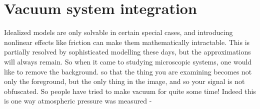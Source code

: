 




\section{Vacuum system integration}
	
	Idealized models are only	solvable in certain special cases, and introducing nonlinear effects	like friction can make them mathematically intractable.
	This is	partially resolved by sophisticated modelling these days, but the	approximations will always remain.
	So when it came to studying	microscopic systems, one would like to remove the background.
	so that	the thing you are examining becomes not only the foreground, but the	only thing in the image, and so your signal is not obfuscated.
	So people	have tried to make vacuum for quite some time! Indeed this is one way	atmospheric pressure was measured - 

